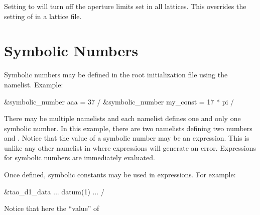 {{{{{{{Setting  to  will turn off the aperture limits set in all
lattices. This overrides the setting of  in a lattice file.

\section{Symbolic Numbers}
\label{s:init.sym} 

Symbolic numbers may be defined in the root initialization file using the 
namelist. Example:
\begin{example}
  &symbolic_number aaa = 37 /
  &symbolic_number my_const = 17 * pi /
\end{example}
There may be multiple  namelists and each namelist defines one and only one
symbolic number. In this example, there are two namelists defining two numbers  and
. Notice that the value of a symbolic number may be an expression. This is unlike any
other namelist in \tao where expressions will generate an error. Expressions for symbolic numbers
are immediately evaluated.

Once defined, symbolic constants may be used in expressions. For example:
\begin{example}
  &tao_d1_data
    ...
    datum(1)%
    ...
  /
\end{example}
Notice that here the ``value'' of \vn{datum(1)%
the namelist is parsed.

Besides setting symbolic numbers in the main initialization file, symbolic numbers can be defined
using the \vn{set symbolic_number} command (\sref{s:set.symbolic}) and a list of symbolic numbers
can be printed using the \vn{show symbolic_number} command (\sref{s:show.symbolic}).

\section{Global Parameter Initialization}
\index{initialization!globals}
\label{s:globals} 

}}}}}}}}
